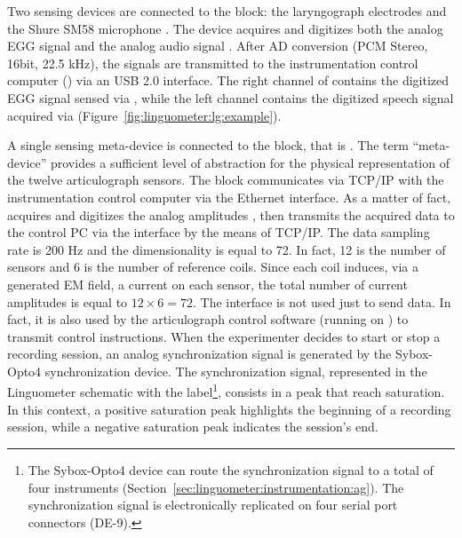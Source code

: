 Two sensing devices are connected to the  block: the laryngograph
electrodes  and the Shure SM58 microphone .
The  device acquires and digitizes both the analog EGG signal
 and the analog audio signal .
After AD conversion (PCM Stereo, 16bit, 22.5 kHz), the signals are transmitted
to the instrumentation control computer () via an USB 2.0 interface. 
The right channel of  contains the digitized  EGG 
signal sensed via , while the left channel contains the digitized
speech signal acquired via  (Figure~\ref{fig:linguometer:lg:example}).

A single sensing meta-device is connected to the  block, that is
.
The term ``meta-device'' provides a sufficient level of abstraction for the
physical representation of the twelve articulograph sensors.
The  block communicates via TCP/IP with the instrumentation control
computer  via the  Ethernet interface.
As a matter of fact,  acquires and digitizes the analog amplitudes
, then transmits the acquired data to the control PC via the 
 interface by the means of TCP/IP.
The  data sampling rate is 200 Hz and the dimensionality is equal to 
72. In fact, 12 is the number of sensors and 6 is the number of reference coils.
Since each coil induces, via a generated EM field, a current on each sensor, the
total number of current amplitudes is equal to $12\times6 = 72$.
The  interface is not used just to send data. 
In fact, it is also used by
the articulograph control software (running on ) to transmit
control instructions.
When the experimenter decides to start or stop a recording session, an analog 
synchronization signal is generated by the Sybox-Opto4 synchronization device.
The synchronization signal, represented in the Linguometer schematic with
the  label\footnote{The Sybox-Opto4 device can route the
synchronization signal to a total of four instruments 
(Section~\ref{sec:linguometer:instrumentation:ag}). The synchronization
signal is electronically replicated on four serial port connectors (DE-9).}, 
consists in a peak that reach saturation. In this context, a positive saturation
peak highlights the beginning of a recording session, while a negative
saturation peak indicates the session's end.

